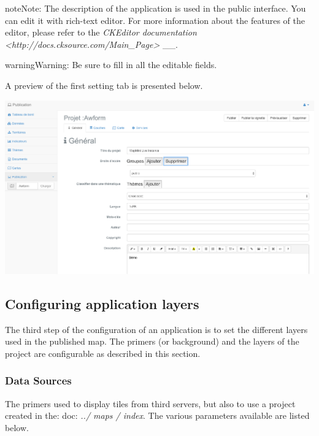 \documentclass[letterpaper,10pt,english]{sphinxmanual}
\begin{document}
\begin{notice}{note}{Note:}
The description of the application is used in the public interface. You can edit it with rich-text editor. For more information about the features of the editor, please refer to the \emph{CKEditor documentation \textless{}http://docs.cksource.com/Main\_Page\textgreater{}} \_\_.
\end{notice}

\begin{notice}{warning}{Warning:}
Be sure to fill in all the editable fields.
\end{notice}

A preview of the first setting tab is presented below.

\includegraphics[width=1.000\linewidth]{publisher-main-conf.png}


\subsection{Configuring application layers}
\label{apps/appconfig:configuration-des-couches-de-l-application}
The third step of the configuration of an application is to set the different layers used in the published map. The primers (or background) and the layers of the project are configurable as described in this section.


\subsubsection{Data Sources}
\label{apps/appconfig:couches-de-fond}
The primers used to display tiles from third servers, but also to use a project created in the: doc: \emph{../ maps / index}. The various parameters available are listed below.
\end{document}
